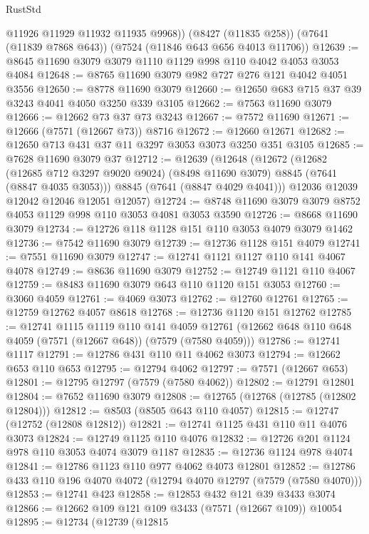 \begin{lexlean}{RustStd}
\begin{coremodule}
        @11926
        @11929
        @11932
        @11935
        @9968))
    (@8427 (@11835 @258))
    (@7641 (@11839 @7868 @643))
    (@7524 (@11846 @643 @656 @4013 @11706))
@12639 := @8645 @11690 @3079 @3079 @1110 @1129 @998 @110 @4042 @4053 @3053 @4084
@12648 := @8765 @11690 @3079 @982 @727 @276 @121 @4042 @4051 @3556
@12650 := @8778 @11690 @3079
@12660 := @12650 @683 @715 @37 @39 @3243 @4041 @4050 @3250 @339 @3105
@12662 := @7563 @11690 @3079
@12666 := @12662 @73 @37 @73 @3243
@12667 := @7572 @11690
@12671 := @12666 (@7571 (@12667 @73)) @8716
@12672 := @12660 @12671
@12682 := @12650 @713 @431 @37 @11 @3297 @3053 @3073 @3250 @351 @3105
@12685 := @7628 @11690 @3079 @37
@12712 := @12639
    (@12648
      (@12672
        (@12682
          (@12685 @712 @3297 @9020 @9024)
          (@8498 @11690 @3079)
          @8845
          (@7641 (@8847 @4035 @3053)))
        @8845
        (@7641 (@8847 @4029 @4041)))
      @12036
      @12039
      @12042
      @12046
      @12051
      @12057)
@12724 := @8748 @11690 @3079 @3079 @8752 @4053 @1129 @998 @110 @3053 @4081 @3053 @3590
@12726 := @8668 @11690 @3079
@12734 := @12726 @118 @1128 @151 @110 @3053 @4079 @3079 @1462
@12736 := @7542 @11690 @3079
@12739 := @12736 @1128 @151 @4079
@12741 := @7551 @11690 @3079
@12747 := @12741 @1121 @1127 @110 @141 @4067 @4078
@12749 := @8636 @11690 @3079
@12752 := @12749 @1121 @110 @4067
@12759 := @8483 @11690 @3079 @643 @110 @1120 @151 @3053
@12760 := @3060 @4059
@12761 := @4069 @3073
@12762 := @12760 @12761
@12765 := @12759 @12762 @4057 @8618
@12768 := @12736 @1120 @151 @12762
@12785 := @12741
    @1115
    @1119
    @110
    @141
    @4059
    @12761
    (@12662 @648 @110 @648 @4059 (@7571 (@12667 @648)) (@7579 (@7580 @4059)))
@12786 := @12741 @1117
@12791 := @12786 @431 @110 @11 @4062 @3073
@12794 := @12662 @653 @110 @653
@12795 := @12794 @4062
@12797 := @7571 (@12667 @653)
@12801 := @12795 @12797 (@7579 (@7580 @4062))
@12802 := @12791 @12801
@12804 := @7652 @11690 @3079
@12808 := @12765 (@12768 (@12785 (@12802 @12804)))
@12812 := @8503 (@8505 @643 @110 @4057)
@12815 := @12747 (@12752 (@12808 @12812))
@12821 := @12741 @1125 @431 @110 @11 @4076 @3073
@12824 := @12749 @1125 @110 @4076
@12832 := @12726 @201 @1124 @978 @110 @3053 @4074 @3079 @1187
@12835 := @12736 @1124 @978 @4074
@12841 := @12786 @1123 @110 @977 @4062 @4073 @12801
@12852 := @12786 @433 @110 @196 @4070 @4072 (@12794 @4070 @12797 (@7579 (@7580 @4070)))
@12853 := @12741 @423
@12858 := @12853 @432 @121 @39 @3433 @3074
@12866 := @12662 @109 @121 @109 @3433 (@7571 (@12667 @109)) @10054
@12895 := @12734
    (@12739
      (@12815

\end{coremodule}
\end{lexlean}
